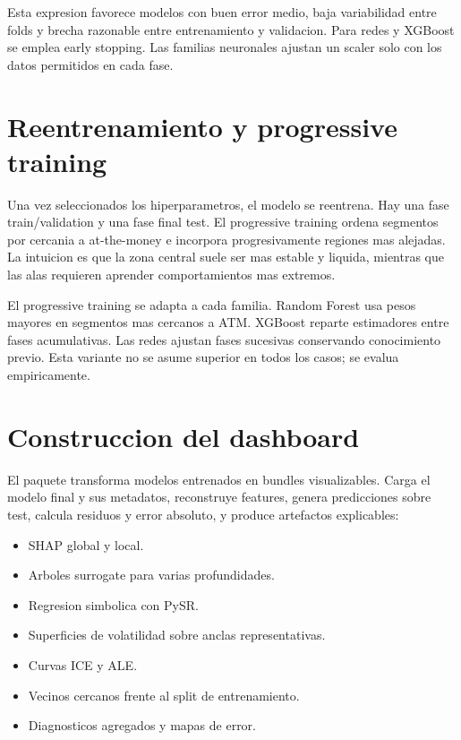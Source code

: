 Esta expresion favorece modelos con buen error medio, baja variabilidad entre folds y brecha razonable entre entrenamiento y validacion. Para redes y XGBoost se emplea early stopping. Las familias neuronales ajustan un scaler solo con los datos permitidos en cada fase.

\section{Reentrenamiento y progressive training}

Una vez seleccionados los hiperparametros, el modelo se reentrena. Hay una fase train/validation y una fase final test. El progressive training ordena segmentos por cercania a at-the-money e incorpora progresivamente regiones mas alejadas. La intuicion es que la zona central suele ser mas estable y liquida, mientras que las alas requieren aprender comportamientos mas extremos.

El progressive training se adapta a cada familia. Random Forest usa pesos mayores en segmentos mas cercanos a ATM. XGBoost reparte estimadores entre fases acumulativas. Las redes ajustan fases sucesivas conservando conocimiento previo. Esta variante no se asume superior en todos los casos; se evalua empiricamente.

\section{Construccion del dashboard}

El paquete  transforma modelos entrenados en bundles visualizables. Carga el modelo final y sus metadatos, reconstruye features, genera predicciones sobre test, calcula residuos y error absoluto, y produce artefactos explicables:

\begin{itemize}
  \item SHAP global y local.
  \item Arboles surrogate para varias profundidades.
  \item Regresion simbolica con PySR.
  \item Superficies de volatilidad sobre anclas representativas.
  \item Curvas ICE y ALE.
  \item Vecinos cercanos frente al split de entrenamiento.
  \item Diagnosticos agregados y mapas de error.
\end{itemize}

